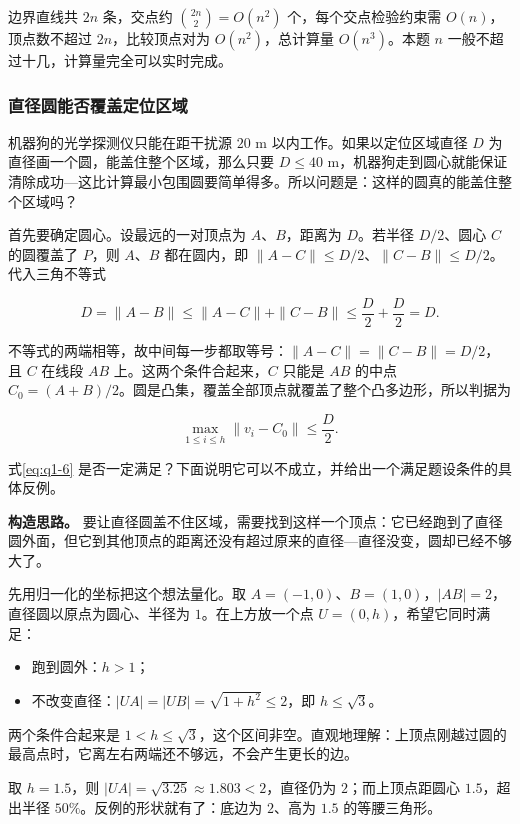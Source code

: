 \documentclass[UTF8,a4paper,zihao=5,fontset=fandol]{ctexart}
\begin{document}
边界直线共 $2n$ 条，交点约 $\binom{2n}{2}=O(n^2)$ 个，每个交点检验约束需 $O(n)$，顶点数不超过 $2n$，比较顶点对为 $O(n^2)$，总计算量 $O(n^3)$。本题 $n$ 一般不超过十几，计算量完全可以实时完成。

\subsubsection{直径圆能否覆盖定位区域}\label{sec:q1-3}

机器狗的光学探测仪只能在距干扰源 $20$ m 以内工作。如果以定位区域直径 $D$ 为直径画一个圆，能盖住整个区域，那么只要 $D\le40$ m，机器狗走到圆心就能保证清除成功---这比计算最小包围圆要简单得多。所以问题是：这样的圆真的能盖住整个区域吗？

首先要确定圆心。设最远的一对顶点为 $A$、$B$，距离为 $D$。若半径 $D/2$、圆心 $C$ 的圆覆盖了 $P$，则 $A$、$B$ 都在圆内，即 $\|A-C\|\le D/2$、$\|C-B\|\le D/2$。代入三角不等式

\[
D=\|A-B\|\le\|A-C\|+\|C-B\|\le\frac D2+\frac D2=D .
\]

不等式的两端相等，故中间每一步都取等号：$\|A-C\|=\|C-B\|=D/2$，且 $C$ 在线段 $AB$ 上。这两个条件合起来，$C$ 只能是 $AB$ 的中点 $C_0=(A+B)/2$。圆是凸集，覆盖全部顶点就覆盖了整个凸多边形，所以判据为

\begin{equation}\label{eq:q1-6}
\max_{1\le i\le h}\|v_i-C_0\|\le\frac D2 .
\end{equation}

式\eqref{eq:q1-6} 是否一定满足？下面说明它可以不成立，并给出一个满足题设条件的具体反例。

\textbf{构造思路。} 要让直径圆盖不住区域，需要找到这样一个顶点：它已经跑到了直径圆外面，但它到其他顶点的距离还没有超过原来的直径---直径没变，圆却已经不够大了。

先用归一化的坐标把这个想法量化。取 $A=(-1,0)$、$B=(1,0)$，$|AB|=2$，直径圆以原点为圆心、半径为 $1$。在上方放一个点 $U=(0,h)$，希望它同时满足：

\begin{itemize}
\item 跑到圆外：$h>1$；
\item 不改变直径：$|UA|=|UB|=\sqrt{1+h^2}\le2$，即 $h\le\sqrt{3}$。
\end{itemize}

两个条件合起来是 $1<h\le\sqrt{3}$，这个区间非空。直观地理解：上顶点刚越过圆的最高点时，它离左右两端还不够远，不会产生更长的边。

取 $h=1.5$，则 $|UA|=\sqrt{3.25}\approx1.803<2$，直径仍为 $2$；而上顶点距圆心 $1.5$，超出半径 $50\%$。反例的形状就有了：底边为 $2$、高为 $1.5$ 的等腰三角形。
\end{document}

